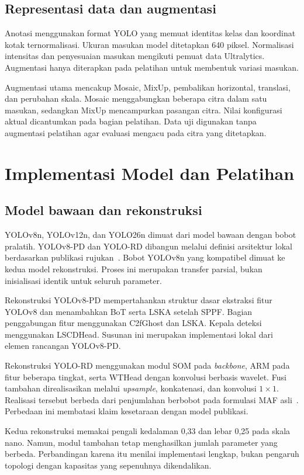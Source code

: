 \subsection{Representasi data dan augmentasi}
Anotasi menggunakan format YOLO yang memuat identitas kelas dan koordinat kotak ternormalisasi. Ukuran masukan model ditetapkan 640 piksel. Normalisasi intensitas dan penyesuaian masukan mengikuti pemuat data Ultralytics. Augmentasi hanya diterapkan pada pelatihan untuk membentuk variasi masukan.

Augmentasi utama mencakup Mosaic, MixUp, pembalikan horizontal, translasi, dan perubahan skala. Mosaic menggabungkan beberapa citra dalam satu masukan, sedangkan MixUp mencampurkan pasangan citra. Nilai konfigurasi aktual dicantumkan pada bagian pelatihan. Data uji digunakan tanpa augmentasi pelatihan agar evaluasi mengacu pada citra yang ditetapkan.

\section{Implementasi Model dan Pelatihan}
\subsection{Model bawaan dan rekonstruksi}
YOLOv8n, YOLOv12n, dan YOLO26n dimuat dari model bawaan dengan bobot pralatih. YOLOv8-PD dan YOLO-RD dibangun melalui definisi arsitektur lokal berdasarkan publikasi rujukan~\cite{Zeng2024,Wang2025}. Bobot YOLOv8n yang kompatibel dimuat ke kedua model rekonstruksi. Proses ini merupakan transfer parsial, bukan inisialisasi identik untuk seluruh parameter.

Rekonstruksi YOLOv8-PD mempertahankan struktur dasar ekstraksi fitur YOLOv8 dan menambahkan BoT serta LSKA setelah SPPF. Bagian penggabungan fitur menggunakan C2fGhost dan LSKA. Kepala deteksi menggunakan LSCDHead. Susunan ini merupakan implementasi lokal dari elemen rancangan YOLOv8-PD.

Rekonstruksi YOLO-RD menggunakan modul SOM pada \textit{backbone}, ARM pada fitur beberapa tingkat, serta WTHead dengan konvolusi berbasis wavelet. Fusi tambahan direalisasikan melalui \textit{upsample}, konkatenasi, dan konvolusi $1\times1$. Realisasi tersebut berbeda dari penjumlahan berbobot pada formulasi MAF asli~\cite{Wang2025}. Perbedaan ini membatasi klaim kesetaraan dengan model publikasi.

Kedua rekonstruksi memakai pengali kedalaman 0,33 dan lebar 0,25 pada skala nano. Namun, modul tambahan tetap menghasilkan jumlah parameter yang berbeda. Perbandingan karena itu menilai implementasi lengkap, bukan pengaruh topologi dengan kapasitas yang sepenuhnya dikendalikan.

